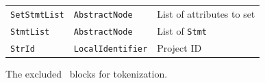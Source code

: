 \begin{table}[hbtp]
\begin{tabular}[t]{lll}
        \vspace{10pt} 
        \texttt{SetStmtList} & \texttt{AbstractNode} & List of attributes to set \\
        \vspace{10pt}
        \texttt{StmtList} & \texttt{AbstractNode} & List of \texttt{Stmt} \\
        \vspace{10pt}
        \texttt{StrId} & \texttt{LocalIdentifier} & Project ID \\            
    \bottomrule
    \end{tabular}
\end{table}

\begin{table}[hbtp]
    \caption[The from tokenization excluded \scratch\ blocks]{\label{tab:excluded-blocks}The excluded \scratch\ blocks for tokenization.}


\end{table}
